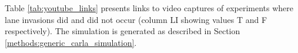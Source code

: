 

Table \ref{tab:youtube_links} presents links to video captures of experiments where lane invasions did and did not occur (column LI showing values T and F respectively). The simulation is generated as described in Section \ref{methods:generic_carla_simulation}.

